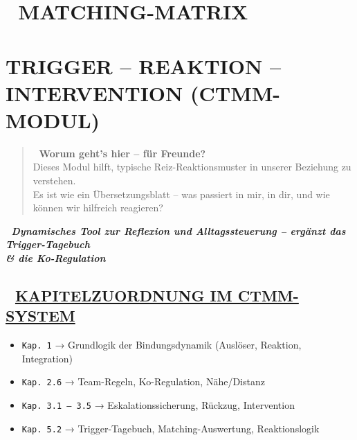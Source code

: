 \hypertarget{matching-matrix}{%
\section{\texorpdfstring{🧩 \textbf{MATCHING-MATRIX}}{🧩 MATCHING-MATRIX}}\label{matching-matrix}}

\hypertarget{trigger-reaktion-intervention-ctmm-modul}{%
\section{\texorpdfstring{\textbf{TRIGGER -- REAKTION -- INTERVENTION (CTMM-MODUL)}}{TRIGGER -- REAKTION -- INTERVENTION (CTMM-MODUL)}}\label{trigger-reaktion-intervention-ctmm-modul}}

\begin{quote}
🧠 \textbf{Worum geht's hier -- für Freunde?}\\
Dieses Modul hilft, typische Reiz-Reaktionsmuster in unserer Beziehung zu verstehen.\\
Es ist wie ein Übersetzungsblatt -- was passiert in mir, in dir, und wie können wir hilfreich reagieren?
\end{quote}

🧩 \emph{\textbf{Dynamisches Tool zur Reflexion und Alltagssteuerung -- ergänzt das Trigger-Tagebuch \\& die Ko-Regulation}}

\hypertarget{section}{%
\subsection{}\label{section}}

\hypertarget{kapitelzuordnung-im-ctmm-system}{%
\subsection{\texorpdfstring{📘 \textbf{\ul{KAPITELZUORDNUNG IM CTMM-SYSTEM}}}{📘 KAPITELZUORDNUNG IM CTMM-SYSTEM}}\label{kapitelzuordnung-im-ctmm-system}}

\begin{itemize}
\tightlist
\item
  \texttt{Kap.\ 1} → Grundlogik der Bindungsdynamik (Auslöser, Reaktion, Integration)
\item
  \texttt{Kap.\ 2.6} → Team-Regeln, Ko-Regulation, Nähe/Distanz
\item
  \texttt{Kap.\ 3.1 -- 3.5} → Eskalationssicherung, Rückzug, Intervention
\item
  \texttt{Kap.\ 5.2} → Trigger-Tagebuch, Matching-Auswertung, Reaktionslogik
\end{itemize}

